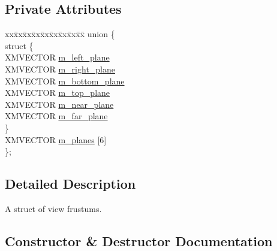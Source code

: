 \subsection*{Private Attributes}
\begin{DoxyCompactItemize}
\item 
\begin{tabbing}
xx\=xx\=xx\=xx\=xx\=xx\=xx\=xx\=xx\=\kill
union \{\\
\>struct \{\\
\>\>XMVECTOR \hyperlink{structmage_1_1_view_frustum_a07375137f59a785cf123c9feca08d393}{m\_left\_plane}\\
\>\>XMVECTOR \hyperlink{structmage_1_1_view_frustum_a95718f7a8fdd743872b93904e99b4268}{m\_right\_plane}\\
\>\>XMVECTOR \hyperlink{structmage_1_1_view_frustum_a66ea2332f1c30b7a1d3ba8f0f0fed347}{m\_bottom\_plane}\\
\>\>XMVECTOR \hyperlink{structmage_1_1_view_frustum_a82076a48eaa7ed305a0a1c43246f93d4}{m\_top\_plane}\\
\>\>XMVECTOR \hyperlink{structmage_1_1_view_frustum_a3f8e1216b85b0f19839229c9cc9d97fb}{m\_near\_plane}\\
\>\>XMVECTOR \hyperlink{structmage_1_1_view_frustum_a02e8a940302c6c2a0d489f0fe35e7f19}{m\_far\_plane}\\
\>\} \\
\>XMVECTOR \hyperlink{structmage_1_1_view_frustum_a671ec972dbd87a714cfd114a57d47949}{m\_planes} \mbox{[}6\mbox{]}\\
\}; \\

\end{tabbing}\end{DoxyCompactItemize}


\subsection{Detailed Description}
A struct of view frustums. 

\subsection{Constructor \& Destructor Documentation}
\hypertarget{structmage_1_1_view_frustum_a907207904846729570c21919415ba7b2}{}\label{structmage_1_1_view_frustum_a907207904846729570c21919415ba7b2} 
